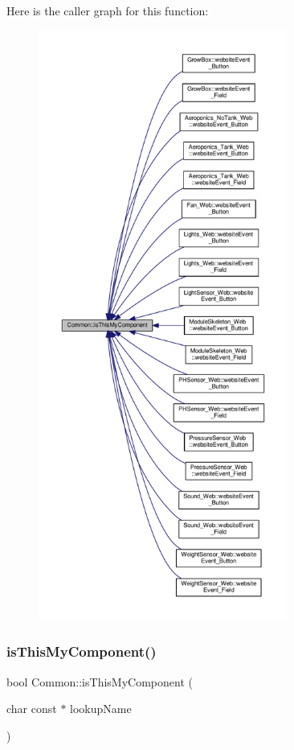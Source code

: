 Here is the caller graph for this function\+:
\nopagebreak
\begin{figure}[H]
\begin{center}
\leavevmode
\includegraphics[height=550pt]{class_common_a0192d295366bf1e966d8b58a3ce57554_icgraph}
\end{center}
\end{figure}
\mbox{\label{class_common_a0192d295366bf1e966d8b58a3ce57554}} 
\subsubsection{\texorpdfstring{is\+This\+My\+Component()}{isThisMyComponent()}\hspace{0.1cm}{\footnotesize\ttfamily [2/2]}}
{\footnotesize\ttfamily bool Common\+::is\+This\+My\+Component (\begin{DoxyParamCaption}\item[{char const $\ast$}]{lookup\+Name }\end{DoxyParamCaption})}

